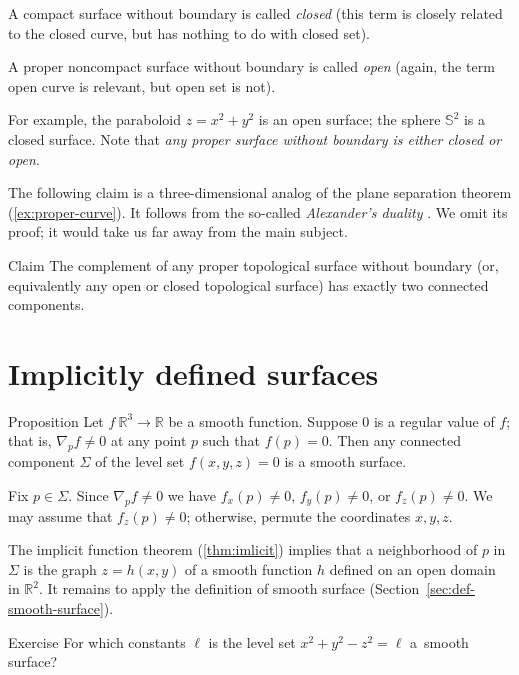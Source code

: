 A compact surface without boundary is called \emph{closed}
(this term is closely related to the closed curve, but has nothing to do with closed set).

A proper noncompact surface without boundary is called \emph{open} (again, the term open curve is relevant, but open set is not).

For example, the paraboloid $z=x^2+y^2$
is an open surface; the 
sphere $\mathbb{S}^2$ is a closed surface.
Note that \textit{any proper surface without boundary is either closed or open}.

The following claim is a three-dimensional analog of the plane separation theorem (\ref{ex:proper-curve}).
It follows from the so-called {}\emph{Alexander's duality} \cite{hatcher}.
We omit its proof; it would take us far away from the main subject.

\begin{thm}{Claim}\label{clm:proper-divides}
The complement of any proper topological surface without boundary (or, equivalently any open or closed topological surface) has exactly two connected components. 
\end{thm}



\section{Implicitly defined surfaces}

\begin{thm}{Proposition}\label{prop:implicit-surface}
Let $f\:\mathbb{R}^3\to \mathbb{R}$ be a smooth function.
Suppose $0$ is a regular value of $f$;
that is, $\nabla_p f\ne 0$ at any point $p$ such that $f(p)=0$.
Then any connected component $\Sigma$ of the level set  $f(x,y,z)=0$ is a smooth surface.
\end{thm}

Fix $p\in\Sigma$.
Since $\nabla_p f\ne 0$ we have 
$f_x(p)\ne 0$,
$f_y(p)\ne 0$, or
$f_z(p)\ne 0$.
We may assume that $f_z(p)\ne 0$;
otherwise, permute the coordinates $x,y,z$.

The implicit function theorem (\ref{thm:imlicit}) implies that a neighborhood of $p$ in $\Sigma$ is the graph $z=h(x,y)$ of a smooth function $h$ defined on an open domain in $\mathbb{R}^2$.
It remains to apply the definition of smooth surface (Section~\ref{sec:def-smooth-surface}).
\qeds

\begin{thm}{Exercise}\label{ex:hyperboloids}
For which constants $\ell$ is the level set $x^2+y^2-z^2=\ell$
a~smooth surface?
\end{thm}

